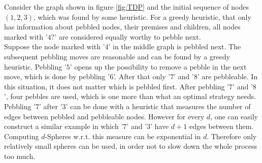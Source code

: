 \documentclass{llncs}
\begin{document}
\begin{example}
\label{example:TDP}
Consider the graph shown in figure \ref{fig:TDP} and the initial sequence of nodes $(1,2,3)$, which was found by some heuristic. 
For a greedy heuristic, that only has information about pebbled nodes, their premises and children, all nodes marked with '$4?$' are considered equally worthy to pebble next.\\
Suppose the node marked with '$4$' in the middle graph is pebbled next.
The subsequent pebbling moves are reasonable and can be found by a greedy heuristic. Pebbling '$5$' opens up the possibility to remove a pebble in the next move, which is done by pebbling '$6$'.
After that only '$7$' and '$8$' are pebbleable. In this situation, it does not matter which is pebbled first.
After pebbling '$7$' and '$8$', four pebbles are used, which is one more than what an optimal strategy needs.\\
Pebbling '$7$' after '$3$' can be done with a heuristic that measures the number of edges between pebbled and pebbleable nodes. However for every $d$, one can easily construct a similar example in which '$7$' and '$3$' have $d + 1$ edges between them. Computing $d$-Spheres w.r.t. this measure can be exponential in $d$. 
Therefore only relatively small spheres can be used, in order not to slow down the whole process too much.


\end{example}
\end{document}

